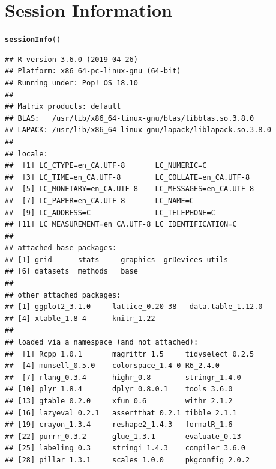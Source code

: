 \documentclass[11pt,letter]{article}\usepackage[]{graphicx}\usepackage[]{color}
\makeatletter
\newcommand{\hlstd}[1]{\textcolor[rgb]{0.345,0.345,0.345}{#1}}%
\newcommand{\hlkwd}[1]{\textcolor[rgb]{0.737,0.353,0.396}{\textbf{#1}}}%
\newenvironment{kframe}{%
 \def\at@end@of@kframe{}%
 \ifinner\ifhmode%
  \def\at@end@of@kframe{\end{minipage}}%
  \begin{minipage}{\columnwidth}%
 \fi\fi%
 \def\FrameCommand##1{\hskip\@totalleftmargin \hskip-\fboxsep
 \colorbox{shadecolor}{##1}\hskip-\fboxsep
     \hskip-\linewidth \hskip-\@totalleftmargin \hskip\columnwidth}%
 \MakeFramed {\advance\hsize-\width
   \@totalleftmargin\z@ \linewidth\hsize
   \@setminipage}}%
 {\par\unskip\endMakeFramed%
 \at@end@of@kframe}
\newenvironment{knitrout}{}{} %
\makeatother
\begin{document}
\section{Session Information}
\begin{knitrout}
\color{fgcolor}\begin{kframe}
\begin{alltt}
\hlkwd{sessionInfo}\hlstd{()}
\end{alltt}
\begin{verbatim}
## R version 3.6.0 (2019-04-26)
## Platform: x86_64-pc-linux-gnu (64-bit)
## Running under: Pop!_OS 18.10
## 
## Matrix products: default
## BLAS:   /usr/lib/x86_64-linux-gnu/blas/libblas.so.3.8.0
## LAPACK: /usr/lib/x86_64-linux-gnu/lapack/liblapack.so.3.8.0
## 
## locale:
##  [1] LC_CTYPE=en_CA.UTF-8       LC_NUMERIC=C              
##  [3] LC_TIME=en_CA.UTF-8        LC_COLLATE=en_CA.UTF-8    
##  [5] LC_MONETARY=en_CA.UTF-8    LC_MESSAGES=en_CA.UTF-8   
##  [7] LC_PAPER=en_CA.UTF-8       LC_NAME=C                 
##  [9] LC_ADDRESS=C               LC_TELEPHONE=C            
## [11] LC_MEASUREMENT=en_CA.UTF-8 LC_IDENTIFICATION=C       
## 
## attached base packages:
## [1] grid      stats     graphics  grDevices utils    
## [6] datasets  methods   base     
## 
## other attached packages:
## [1] ggplot2_3.1.0     lattice_0.20-38   data.table_1.12.0
## [4] xtable_1.8-4      knitr_1.22       
## 
## loaded via a namespace (and not attached):
##  [1] Rcpp_1.0.1       magrittr_1.5     tidyselect_0.2.5
##  [4] munsell_0.5.0    colorspace_1.4-0 R6_2.4.0        
##  [7] rlang_0.3.4      highr_0.8        stringr_1.4.0   
## [10] plyr_1.8.4       dplyr_0.8.0.1    tools_3.6.0     
## [13] gtable_0.2.0     xfun_0.6         withr_2.1.2     
## [16] lazyeval_0.2.1   assertthat_0.2.1 tibble_2.1.1    
## [19] crayon_1.3.4     reshape2_1.4.3   formatR_1.6     
## [22] purrr_0.3.2      glue_1.3.1       evaluate_0.13   
## [25] labeling_0.3     stringi_1.4.3    compiler_3.6.0  
## [28] pillar_1.3.1     scales_1.0.0     pkgconfig_2.0.2
\end{verbatim}
\end{kframe}
\end{knitrout}
\end{document}
